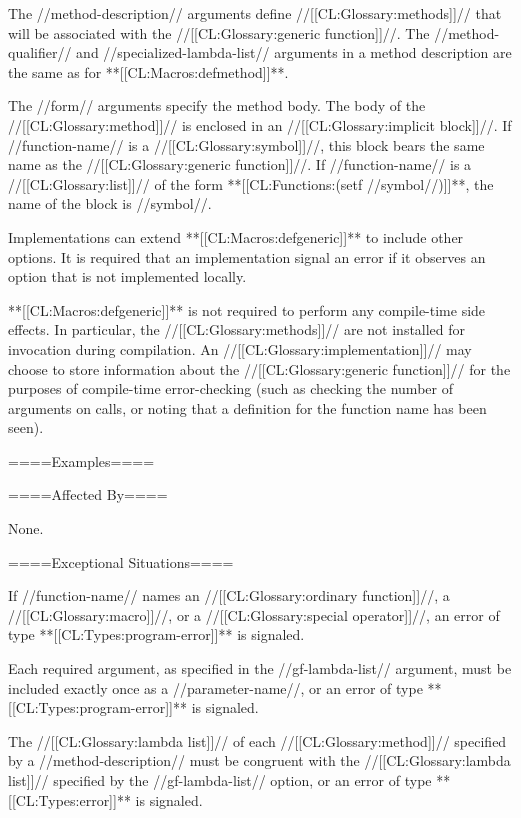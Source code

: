 \endlist

The //method-description// arguments define //[[CL:Glossary:methods]]// that will be associated with the //[[CL:Glossary:generic function]]//. The //method-qualifier// and //specialized-lambda-list// arguments in a method description are the same as for **[[CL:Macros:defmethod]]**.

The //form// arguments specify the method body. The body of the //[[CL:Glossary:method]]// is enclosed in an //[[CL:Glossary:implicit block]]//. If //function-name// is a //[[CL:Glossary:symbol]]//, this block bears the same name as the //[[CL:Glossary:generic function]]//. If //function-name// is a //[[CL:Glossary:list]]// of the form **[[CL:Functions:(setf //symbol//)]]**, the name of the block is //symbol//.

Implementations can extend **[[CL:Macros:defgeneric]]** to include other options. It is required that an implementation signal an error if it observes an option that is not implemented locally.

**[[CL:Macros:defgeneric]]** is not required to perform any compile-time side effects. In particular, the //[[CL:Glossary:methods]]// are not installed for invocation during compilation. An //[[CL:Glossary:implementation]]// may choose to store information about the //[[CL:Glossary:generic function]]// for the purposes of compile-time error-checking (such as checking the number of arguments on calls, or noting that a definition for the function name has been seen).

====Examples====


====Affected By====

None.

====Exceptional Situations====

If //function-name// names an //[[CL:Glossary:ordinary function]]//, a //[[CL:Glossary:macro]]//, or a //[[CL:Glossary:special operator]]//, an error of type **[[CL:Types:program-error]]** is signaled.

Each required argument, as specified in the //gf-lambda-list// argument, must be included exactly once as a //parameter-name//, or an error of type **[[CL:Types:program-error]]** is signaled.

The //[[CL:Glossary:lambda list]]// of each //[[CL:Glossary:method]]// specified by a //method-description// must be congruent with the //[[CL:Glossary:lambda list]]// specified by the //gf-lambda-list// option, or an error of type **[[CL:Types:error]]** is signaled.

